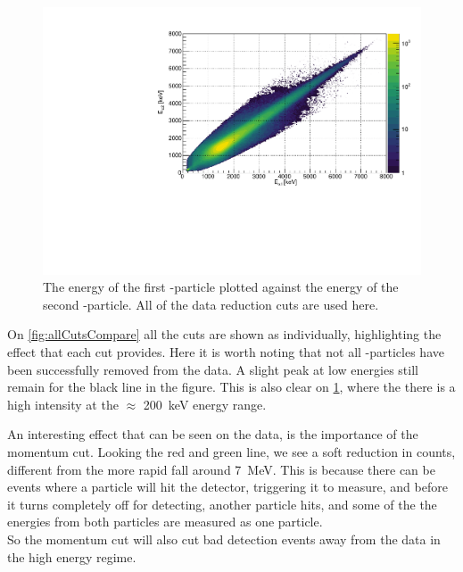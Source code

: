 \begin{figure}[h]
	\centering
	\includegraphics[width=\linewidth]{../figures/EE.pdf}
	\caption{The energy of the first \al-particle plotted against the energy of the second \al-particle. All of the data reduction cuts are used here.}
	\label{fig:EEAllCuts}
\end{figure}
On \cref{fig:allCutsCompare} all the cuts are shown as individually, highlighting the effect that each cut provides. Here it is worth noting that not all \be-particles have been successfully removed from the data. A slight peak at low energies still remain for the black line in the figure. This is also clear on \cref{fig:EEAllCuts}, where the there is a high intensity at the $\approx$ \SI{200}{keV} energy range. 

An interesting effect that can be seen on the data, is the importance of the momentum cut. Looking the red and green line, we see a soft reduction in counts, different from the more rapid fall around \SI{7}{MeV}. This is because there can be events where a particle will hit the detector, triggering it to measure, and before it turns completely off for detecting, another particle hits, and some of the the energies from both particles are measured as one particle. \\
So the momentum cut will also cut bad detection events away from the data in the high energy regime. 



